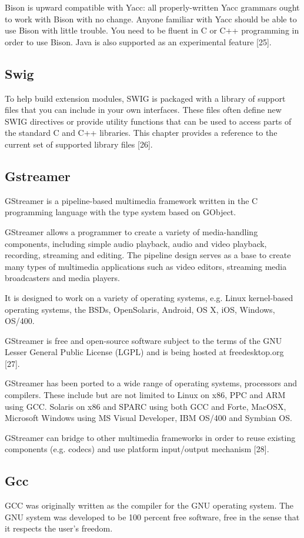 \documentclass[12pt,a4paper,oneside]{memoir}
\begin{document}
Bison is upward compatible with Yacc: all properly-written Yacc grammars ought to work with Bison with no change. Anyone familiar with Yacc should be able to use Bison with little trouble. You need to be fluent in C or C++ programming in order to use Bison. Java is also supported as an experimental feature [25].
\subsection{Swig}
To help build extension modules, SWIG is packaged with a library of support files that you can include in your own interfaces. These files often define new SWIG directives or provide utility functions that can be used to access parts of the standard C and C++ libraries. This chapter provides a reference to the current set of supported library files [26].
\subsection{Gstreamer} 
GStreamer is a pipeline-based multimedia framework written in the C programming language with the type system based on GObject.

GStreamer allows a programmer to create a variety of media-handling components, including simple audio playback, audio and video playback, recording, streaming and editing. The pipeline design serves as a base to create many types of multimedia applications such as video editors, streaming media broadcasters and media players.

It is designed to work on a variety of operating systems, e.g. Linux kernel-based operating systems, the BSDs, OpenSolaris, Android, OS X, iOS, Windows, OS/400.

GStreamer is free and open-source software subject to the terms of the GNU Lesser General Public License (LGPL) and is being hosted at freedesktop.org [27].
 	
GStreamer has been ported to a wide range of operating systems, processors and compilers. These include but are not limited to Linux on x86, PPC and ARM using GCC. Solaris on x86 and SPARC using both GCC and Forte, MacOSX, Microsoft Windows using MS Visual Developer, IBM OS/400 and Symbian OS.

GStreamer can bridge to other multimedia frameworks in order to reuse existing components (e.g. codecs) and use platform input/output mechanism [28].

\subsection{Gcc}
GCC was originally written as the compiler for the GNU operating system. The GNU system was developed to be 100 percent free software, free in the sense that it respects the user's freedom.
\end{document}
